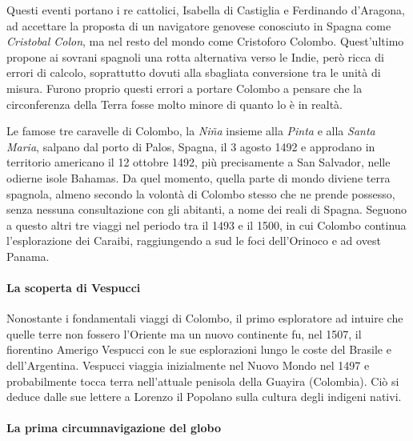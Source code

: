 \documentclass[11pt]{report}
\begin{document}
	Questi eventi portano i re cattolici, Isabella di Castiglia e Ferdinando d'Aragona, ad accettare la proposta di un navigatore genovese conosciuto in Spagna come \textit{Cristobal Colon}, ma nel resto del mondo come Cristoforo Colombo. Quest'ultimo propone ai sovrani spagnoli una rotta alternativa verso le Indie, però ricca di errori di calcolo, soprattutto dovuti alla sbagliata conversione tra le unità di misura. Furono proprio questi errori a portare Colombo a pensare che la circonferenza della Terra fosse molto minore di quanto lo è in realtà.
	
	Le famose tre caravelle di Colombo, la \textit{Niña} insieme alla \textit{Pinta} e alla \textit{Santa Maria}, salpano dal porto di Palos, Spagna, il 3 agosto 1492 e approdano in territorio americano il 12 ottobre 1492, più precisamente a San Salvador, nelle odierne isole Bahamas. Da quel momento, quella parte di mondo diviene terra spagnola, almeno secondo la volontà di Colombo stesso che ne prende possesso, senza nessuna consultazione con gli abitanti, a nome dei reali di Spagna. Seguono a questo altri tre viaggi nel periodo tra il 1493 e il 1500, in cui Colombo continua l'esplorazione dei Caraibi, raggiungendo a sud le foci dell'Orinoco e ad ovest Panama.
	
	\paragraph{La scoperta di Vespucci}
	
	Nonostante i fondamentali viaggi di Colombo, il primo esploratore ad intuire che quelle terre non fossero l'Oriente ma un nuovo continente fu, nel 1507, il fiorentino Amerigo Vespucci con le sue esplorazioni lungo le coste del Brasile e dell'Argentina. Vespucci viaggia inizialmente nel Nuovo Mondo nel 1497 e probabilmente tocca terra nell'attuale penisola della Guayira (Colombia). Ciò si deduce dalle sue lettere a Lorenzo il Popolano sulla cultura degli indigeni nativi.\cite{robertson1917vespucci}
	
	\paragraph*{La prima circumnavigazione del globo}
	
\end{document}
